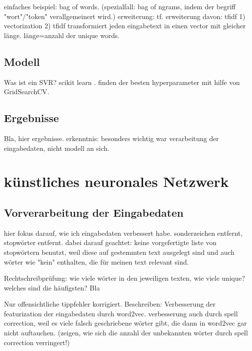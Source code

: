 einfaches beispiel: bag of words. (spezialfall: bag of ngrams, indem der begriff "wort"/"token" verallgemeinert wird.)
erweiterung: tf. erweiterung davon: tfidf
1) vectorization
2) tfidf transformiert jeden eingabetext in einen vector mit gleicher länge. länge=anzahl der unique words.
\subsection{Modell}

Was ist ein SVR?
scikit learn \citep{JMLR:v12:pedregosa11a}.
finden der besten hyperparameter mit hilfe von GridSearchCV.

\subsection{Ergebnisse}
Bla, hier ergebnisse. erkenntnis: besonders wichtig war verarbeitung der eingabedaten, nicht modell an sich.

\section{künstliches neuronales Netzwerk}\label{section:ELM}
\subsection{Vorverarbeitung der Eingabedaten}
hier fokus darauf, wie ich eingabedaten verbessert habe. sonderzeichen entfernt, stopwörter entfernt. dabei darauf geachtet: keine vorgefertigte liste von stopwörtern benutzt, weil diese auf gestemmten text ausgelegt sind und auch wörter wie "kein" enthalten, die für meinen text relevant sind.


Rechtschreibprüfung: wie viele wörter in den jeweiligen texten, wie viele unique? welches sind die häufigsten? Bla

Nur offensichtliche tippfehler korrigiert.
Beschreiben: Verbesserung der featurization der eingabedaten durch word2vec. verbesserung auch durch spell correction, weil es viele falsch geschriebene wörter gibt, die dann in word2vec gar nicht auftauchen. (zeigen, wie sich die anzahl der unbekannten wörter durch spell correction verringert!)

